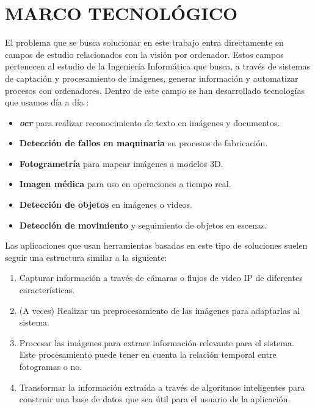 \section{MARCO TECNOLÓGICO}

El problema que se busca solucionar en este trabajo entra directamente en campos de estudio relacionados con la visión por ordenador. Estos campos pertenecen al estudio  de la Ingeniería Informática que busca, 
a través de sistemas de captación y procesamiento de imágenes, generar información y automatizar procesos con ordenadores. \newline Dentro de este campo se han desarrollado tecnologías que usamos día a día
\cite{szeliskiComputerVisionAlgorithms2022}:

\begin{itemize}
    \item \textbf{\textit{\acrfull{ocr}}} para realizar reconocimiento de texto en imágenes y documentos.
    \item \textbf{Detección de fallos en maquinaria} en procesos de fabricación.
    \item \textbf{Fotogrametría} para mapear imágenes a modelos 3D.
    \item \textbf{Imagen médica} para uso en operaciones a tiempo real\cite{NEMESIS3DCM}.
    \item \textbf{Detección de objetos} en imágenes o videos.
    \item \textbf{Detección de movimiento} y seguimiento de objetos en escenas.
\end{itemize}

Las aplicaciones que usan herramientas basadas en este tipo de soluciones suelen seguir una estructura similar a la siguiente:

\begin{enumerate}
    \item Capturar información a través de cámaras o flujos de video IP de diferentes características.
    \item (A veces) Realizar un preprocesamiento de las imágenes para adaptarlas al sistema.
    \item Procesar las imágenes para extraer información relevante para el sistema. Este procesamiento puede tener en cuenta la relación temporal entre fotogramas o no.
    \item Transformar la información extraída a través de algoritmos inteligentes para construir una base de datos que sea útil para el usuario de la aplicación.
\end{enumerate}

